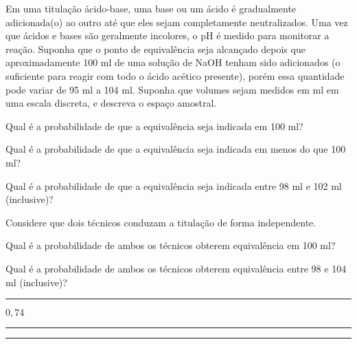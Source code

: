 \documentclass[a4paper,11pt,fleqn]{article}\usepackage[]{graphicx}\usepackage[]{color}
\theoremstyle{definition}
\begin{document}
\begin{compactenum}
\item Em uma titulação ácido-base, uma base ou um ácido é gradualmente
  adicionada(o) ao outro até que eles sejam completamente neutralizados.
  Uma vez que ácidos e bases são geralmente incolores, o pH é medido
  para monitorar a reação. Suponha que o ponto de equivalência seja
  alcançado depois que aproximadamente 100 ml de uma solução de NaOH
  tenham sido adicionados (o suficiente para reagir com todo o ácido
  acético presente), porém essa quantidade pode variar de 95 ml a 104
  ml. Suponha que volumes sejam medidos em ml em uma escala discreta, e
  descreva o espaço amostral.
  \begin{compactenum}
  \item Qual é a probabilidade de que a equivalência seja indicada em
    100 ml?
  \item Qual é a probabilidade de que a equivalência seja indicada em
    menos do que 100 ml?
  \item Qual é a probabilidade de que a equivalência seja indicada entre
    98 ml e 102 ml (inclusive)?
  \item Considere que dois técnicos conduzam a titulação de forma
    independente.
    \begin{compactenum}
    \item Qual é a probabilidade de ambos os técnicos obterem
      equivalência em 100 ml?
    \item Qual é a probabilidade de ambos os técnicos obterem
      equivalência entre 98 e 104 ml (inclusive)?
    \end{compactenum}
  \end{compactenum}

\vspace{0.3cm}
\hrule
\vspace{0.3cm}

\item $0,74$

\vspace{0.3cm}
\hrule
\vspace{0.3cm}

\clearpage

\vspace{0.3cm}
\hrule
\vspace{0.3cm}


\end{compactenum}
\end{document}
